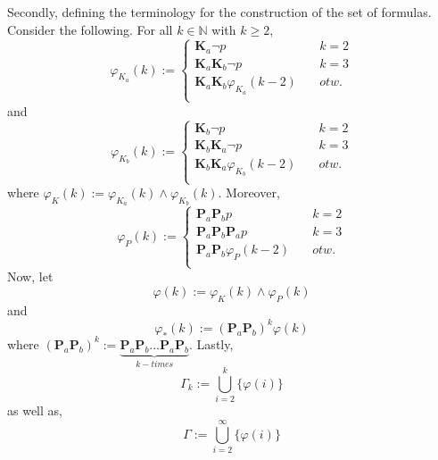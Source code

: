 \documentclass[11pt,a4paper]{article}
\newcommand{\eall}{\mathbf{K}}
\newcommand{\esome}{\mathbf{P}}
\begin{document}
Secondly, defining the terminology for the construction of the set of formulas. Consider the following. For all $k \in \mathbb{N}$ with $k \geq 2$,
\begin{equation*}
\varphi_{K_a}(k):= 
\begin{cases}
\eall_a \neg p & \quad k = 2 \\
\eall_a \eall_b \neg p & \quad k = 3 \\
\eall_a \eall_b \varphi_{K_a}(k-2) & \quad otw. \\
\end{cases}
\end{equation*}
and
\begin{equation*}
\varphi_{K_b}(k):= 
\begin{cases}
\eall_b \neg p & \quad k = 2 \\
\eall_b \eall_a \neg p & \quad k = 3 \\
\eall_b \eall_a \varphi_{K_b}(k-2) & \quad otw. \\
\end{cases}
\end{equation*}
where $\varphi_{K}(k):= \varphi_{K_a}(k) \land \varphi_{K_b}(k)$. 
Moreover, 
\begin{equation*}
\varphi_{P}(k):= 
\begin{cases}
\esome_a \esome_b p & \quad k = 2 \\
\esome_a \esome_b \esome_a p & \quad k = 3 \\
\esome_a \esome_b \varphi_P(k-2) & \quad otw. \\
\end{cases}
\end{equation*}
Now, let
\begin{equation*}
\varphi(k) :=\varphi_{K}(k) \land \varphi_P(k)
\end{equation*}
and
\begin{equation*}
\varphi_{*}(k):= (\esome_a \esome_b)^k \varphi(k)
\end{equation*}
where $(\esome_a \esome_b)^k:= \underbrace{\esome_a \esome_b \dots \esome_a \esome_b}_{\mathit{k-times}} $.
Lastly, 
\begin{equation*}
\Gamma_{k}:=  \bigcup_{i=2}^k \{\varphi(i)\}
\end{equation*}
as well as,
\begin{equation*}
\Gamma:=  \bigcup_{i=2}^{\infty} \{\varphi(i)\}
\end{equation*}
\end{document}
